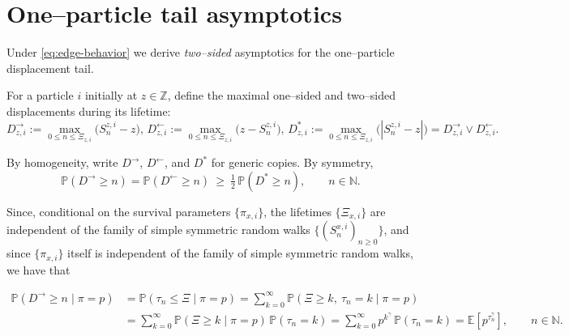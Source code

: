 \documentclass[preprint]{imsart}
\newcommand{\PP}{\mathbb{P}}
\newcommand{\EE}{\mathbb{E}}
\newcommand{\1}{\mathbf{1}}
\theoremstyle{plain}
\theoremstyle{definition}
\begin{document}
\section{One–particle tail asymptotics}\label{sec:one_particle}

Under \eqref{eq:edge-behavior} we derive \emph{two–sided} asymptotics for the one–particle displacement tail. 


For a particle $i$ initially at $z\in\mathbb{Z}$, define the maximal one–sided and two–sided displacements during its lifetime:
\[
D^{\rightarrow}_{z,i}:=\max_{0\le n\le \Xi_{z,i}}\big(S^{z,i}_n-z\big),\,
D^{\leftarrow}_{z,i}:=\max_{0\le n\le \Xi_{z,i}}\big(z-S^{z,i}_n\big),\,
D^{*}_{z,i}:=\max_{0\le n\le \Xi_{z,i}}\big(|S^{z,i}_n-z|\big)=D^{\rightarrow}_{z,i}\vee D^{\leftarrow}_{z,i}.
\]


By homogeneity, write $D^{\rightarrow}$, $D^{\leftarrow}$, and $D^{*}$ for generic copies. By symmetry,
\begin{equation}\label{eq:dstar-half}
\mathbb{P}(D^{\rightarrow}\ge n)=\mathbb{P}(D^{\leftarrow}\ge n)\ \ge\ \tfrac12\,\mathbb{P}(D^{*}\ge n),\qquad n\in\mathbb{N}.
\end{equation}

Since, conditional on the survival parameters $\{\pi_{x,i}\}$, the lifetimes $\{\Xi_{x,i}\}$ are independent of the family of simple symmetric random walks $\{(S^{x,i}_n)_{n\ge 0}\}$, and since $\{\pi_{x,i}\}$ itself is independent of the family of simple symmetric random walks, we have that


\begin{equation}\label{eq:reduce-key-EN-eps}
\begin{aligned}
\PP(D^{\rightarrow}\ge n\mid \pi=p)&= \PP(\tau_n\le \Xi\mid \pi=p)= \sum_{k=0}^{\infty}\PP(\Xi\ge k,\ \tau_n=k\mid \pi=p)\\
&= \sum_{k=0}^{\infty}\PP(\Xi\ge k\mid \pi=p)\,\PP(\tau_n=k)= \sum_{k=0}^{\infty} p^{k^{\gamma}}\,\PP(\tau_n=k)
= \EE\!\left[p^{\tau_n^{\gamma}}\right], \qquad n\in\mathbb{N}.
\end{aligned}
\end{equation}
\end{document}
